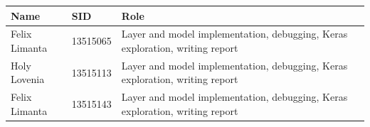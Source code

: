 \documentclass[11pt]{article}
\begin{document}
\begin{longtable}[]{@{}lll@{}}
\toprule
\begin{minipage}[b]{0.30\columnwidth}\raggedright
Name\strut
\end{minipage} & \begin{minipage}[b]{0.30\columnwidth}\raggedright
SID\strut
\end{minipage} & \begin{minipage}[b]{0.30\columnwidth}\raggedright
Role\strut
\end{minipage}\tabularnewline
\midrule
\endhead
\begin{minipage}[t]{0.30\columnwidth}\raggedright
Felix Limanta\strut
\end{minipage} & \begin{minipage}[t]{0.30\columnwidth}\raggedright
13515065\strut
\end{minipage} & \begin{minipage}[t]{0.30\columnwidth}\raggedright
Layer and model implementation, debugging, Keras exploration, writing
report\strut
\end{minipage}\tabularnewline
\begin{minipage}[t]{0.30\columnwidth}\raggedright
Holy Lovenia\strut
\end{minipage} & \begin{minipage}[t]{0.30\columnwidth}\raggedright
13515113\strut
\end{minipage} & \begin{minipage}[t]{0.30\columnwidth}\raggedright
Layer and model implementation, debugging, Keras exploration, writing
report\strut
\end{minipage}\tabularnewline
\begin{minipage}[t]{0.30\columnwidth}\raggedright
Felix Limanta\strut
\end{minipage} & \begin{minipage}[t]{0.30\columnwidth}\raggedright
13515143\strut
\end{minipage} & \begin{minipage}[t]{0.30\columnwidth}\raggedright
Layer and model implementation, debugging, Keras exploration, writing
report\strut
\end{minipage}\tabularnewline
\bottomrule
\end{longtable}


    
    
    
    
\end{document}
